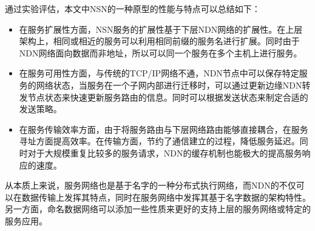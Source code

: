 通过实验评估，本文中NSN的一种原型的性能与特点可以总结如下：
\begin{itemize}
\item 在服务扩展性方面，NSN服务的扩展性基于下层NDN网络的扩展性。在上层架构上，相同或相近的服务可以利用相同前缀的服务名进行扩展。同时由于NDN网络面向数据而非地址，所以可以同一个服务在多个主机上进行服务。
\item 在服务可用性方面，与传统的TCP/IP网络不通，NDN节点中可以保存特定服务的网络状态，当服务在一个子网内部进行迁移时，可以通过更新边缘NDN转发节点状态来快速更新服务路由的信息。同时可以根据发送状态来制定合适的发送策略。
\item 在服务传输效率方面，由于将服务路由与下层网络路由能够直接耦合，在服务寻址方面提高效率。在传输方面，节约了通信建立的过程，降低服务延迟。同时对于大规模重复比较多的服务请求，NDN的缓存机制也能极大的提高服务响应的速度。
\end{itemize}

从本质上来说，服务网络也是基于名字的一种分布式执行网络，而NDN的不仅可以在数据传输上发挥其特点，同时在服务网络中发挥其基于名字数据的架构特性。另一方面，命名数据网络可以添加一些性质来更好的支持上层的服务网络或特定的服务应用。